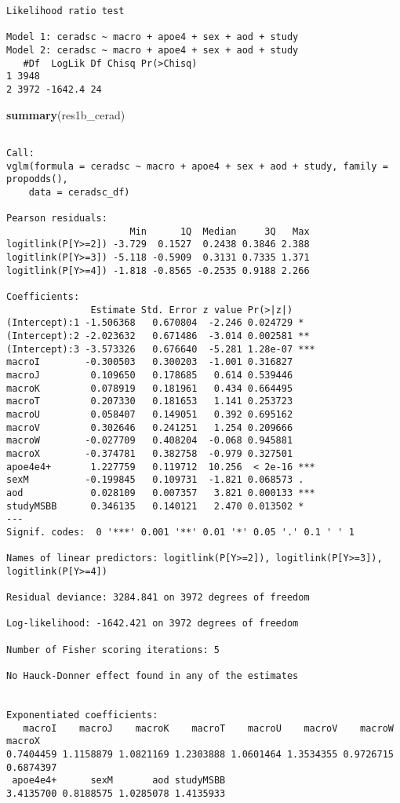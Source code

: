 \documentclass[]{book}
\newenvironment{Shaded}{\begin{snugshade}}{\end{snugshade}}
\newcommand{\KeywordTok}[1]{\textcolor[rgb]{0.13,0.29,0.53}{\textbf{#1}}}
\newcommand{\NormalTok}[1]{#1}
\begin{document}
\begin{verbatim}
Likelihood ratio test

Model 1: ceradsc ~ macro + apoe4 + sex + aod + study
Model 2: ceradsc ~ macro + apoe4 + sex + aod + study
   #Df  LogLik Df Chisq Pr(>Chisq)
1 3948                            
2 3972 -1642.4 24                 
\end{verbatim}

\begin{Shaded}
\begin{Highlighting}[]
\KeywordTok{summary}\NormalTok{(res1b_cerad)}
\end{Highlighting}
\end{Shaded}

\begin{verbatim}

Call:
vglm(formula = ceradsc ~ macro + apoe4 + sex + aod + study, family = propodds(), 
    data = ceradsc_df)

Pearson residuals:
                      Min      1Q  Median     3Q   Max
logitlink(P[Y>=2]) -3.729  0.1527  0.2438 0.3846 2.388
logitlink(P[Y>=3]) -5.118 -0.5909  0.3131 0.7335 1.371
logitlink(P[Y>=4]) -1.818 -0.8565 -0.2535 0.9188 2.266

Coefficients: 
               Estimate Std. Error z value Pr(>|z|)    
(Intercept):1 -1.506368   0.670804  -2.246 0.024729 *  
(Intercept):2 -2.023632   0.671486  -3.014 0.002581 ** 
(Intercept):3 -3.573326   0.676640  -5.281 1.28e-07 ***
macroI        -0.300503   0.300203  -1.001 0.316827    
macroJ         0.109650   0.178685   0.614 0.539446    
macroK         0.078919   0.181961   0.434 0.664495    
macroT         0.207330   0.181653   1.141 0.253723    
macroU         0.058407   0.149051   0.392 0.695162    
macroV         0.302646   0.241251   1.254 0.209666    
macroW        -0.027709   0.408204  -0.068 0.945881    
macroX        -0.374781   0.382758  -0.979 0.327501    
apoe4e4+       1.227759   0.119712  10.256  < 2e-16 ***
sexM          -0.199845   0.109731  -1.821 0.068573 .  
aod            0.028109   0.007357   3.821 0.000133 ***
studyMSBB      0.346135   0.140121   2.470 0.013502 *  
---
Signif. codes:  0 '***' 0.001 '**' 0.01 '*' 0.05 '.' 0.1 ' ' 1

Names of linear predictors: logitlink(P[Y>=2]), logitlink(P[Y>=3]), 
logitlink(P[Y>=4])

Residual deviance: 3284.841 on 3972 degrees of freedom

Log-likelihood: -1642.421 on 3972 degrees of freedom

Number of Fisher scoring iterations: 5 

No Hauck-Donner effect found in any of the estimates


Exponentiated coefficients:
   macroI    macroJ    macroK    macroT    macroU    macroV    macroW    macroX 
0.7404459 1.1158879 1.0821169 1.2303888 1.0601464 1.3534355 0.9726715 0.6874397 
 apoe4e4+      sexM       aod studyMSBB 
3.4135700 0.8188575 1.0285078 1.4135933 
\end{verbatim}
\end{document}
